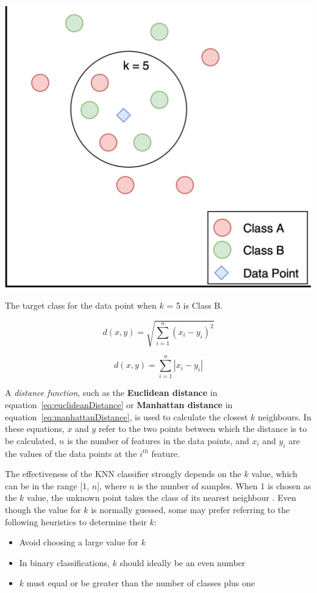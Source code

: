 \begin{marginfigure}
    \includegraphics{graphics/classification/ClassificationKNeighbours.png}
    \caption{
    The target class for the data point when $k$ = 5 is Class B.
    }
    \label{fig:classification-knearestneighbours}
\end{marginfigure}

\begin{equation}\label{eq:euclideanDistance}
    d(x,y) = \sqrt{\sum_{i=1}^{n}(x_{i}-y_{i})^2}
\end{equation}

\begin{equation}\label{eq:manhattanDistance}
    d(x,y) = \sum_{i=1}^{n}|x_{i}-y_{i}|
\end{equation}

A \textit{distance function}, such as the \textbf{Euclidean distance} in equation~\ref{eq:euclideanDistance} or \textbf{Manhattan distance} in equation~\ref{eq:manhattanDistance}, is used to calculate the closest $k$ neighbours. In these equations, $x$ and $y$ refer to the two points between which the distance is to be calculated, $n$ is the number of features in the data points, and $x_i$ and $y_i$ are the values of the data points at the $i^{th}$ feature.

The effectiveness of the KNN classifier strongly depends on the $k$ value, which can be in the range [1, $n$], where $n$ is the number of samples. When 1 is chosen as the $k$ value, the unknown point takes the class of its nearest neighbour \citep{neelamegam2013}. Even though the value for $k$ is normally guessed, some may prefer referring to the following heuristics \citep{kirk2017} to determine their $k$:
\begin{itemize}
    \item Avoid choosing a large value for $k$
    \item In binary classifications, $k$ should ideally be an even number
    \item $k$ must equal or be greater than the number of classes plus one
\end{itemize}

